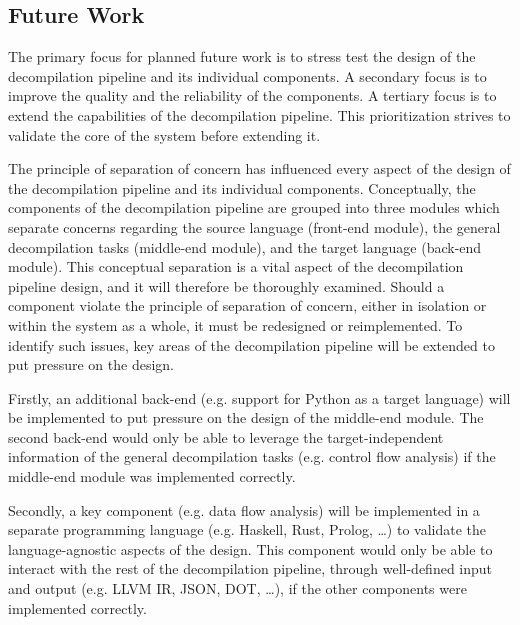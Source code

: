 
\subsection{Future Work}
\label{sec:future_work}

The primary focus for planned future work is to stress test the design of the decompilation pipeline and its individual components. A secondary focus is to improve the quality and the reliability of the components. A tertiary focus is to extend the capabilities of the decompilation pipeline. This prioritization strives to validate the core of the system before extending it.

The principle of separation of concern has influenced every aspect of the design of the decompilation pipeline and its individual components. Conceptually, the components of the decompilation pipeline are grouped into three modules which separate concerns regarding the source language (front-end module), the general decompilation tasks (middle-end module), and the target language (back-end module). This conceptual separation is a vital aspect of the decompilation pipeline design, and it will therefore be thoroughly examined. Should a component violate the principle of separation of concern, either in isolation or within the system as a whole, it must be redesigned or reimplemented. To identify such issues, key areas of the decompilation pipeline will be extended to put pressure on the design.



Firstly, an additional back-end (e.g. support for Python as a target language) will be implemented to put pressure on the design of the middle-end module. The second back-end would only be able to leverage the target-independent information of the general decompilation tasks (e.g. control flow analysis) if the middle-end module was implemented correctly.

Secondly, a key component (e.g. data flow analysis) will be implemented in a separate programming language (e.g. Haskell, Rust, Prolog, …) to validate the language-agnostic aspects of the design. This component would only be able to interact with the rest of the decompilation pipeline, through well-defined input and output (e.g. LLVM IR, JSON, DOT, …), if the other components were implemented correctly.

